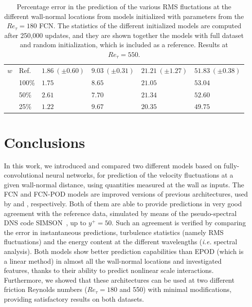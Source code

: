 \begin{table}
{\begin{tabular}{l l*{4}{c}}
        $w$                             & Ref.     & $1.86~(\pm 0.60)$           & $9.03~(\pm 0.31)$            & $21.21~(\pm 1.27)$            & $51.83~(\pm 0.38)$           \\
                                        & 100\%    & $1.75\phantom{~(\pm 0.00)}$ & $8.65\phantom{~(\pm 0.00)}$  & $21.05\phantom{~(\pm 0.00)}$  & $53.04\phantom{~(\pm 0.00)}$ \\
                                        & 50\%     & $2.61\phantom{~(\pm 0.00)}$ & $7.70\phantom{~(\pm 0.00)}$  & $21.34\phantom{~(\pm 0.00)}$  & $52.60\phantom{~(\pm 0.00)}$ \\
                                        & 25\%     & $1.22\phantom{~(\pm 0.00)}$ & $9.67\phantom{~(\pm 0.00)}$  & $20.35\phantom{~(\pm 0.00)}$  & $49.75\phantom{~(\pm 0.00)}$ \\
    \end{tabular}%
    }
    \caption{Percentage error in the prediction of the various RMS fluctations at the different wall-normal locations from models initialized with parameters from the $Re_{\tau}=180$ FCN. The statistics of the different initialized models are computed after 250,000 updates, and they are shown together the models with full dataset and random initialization, which is included as a reference. Results at $Re_{\tau}=550$.}
    \label{tab:RMS_err_transfer}
\end{table}

\section{Conclusions}\label{ss:conclu}

In this work, we introduced and compared two different models based on fully-convolutional neural networks, for prediction of the velocity fluctuations at a given wall-normal distance, using quantities measured at the wall as inputs.
The FCN and FCN-POD models are improved versions of previous architectures, used by \citet{guastoni2020prediction} and \citet{guemes2019sensing}, respectively.
Both of them are able to provide predictions in very good agreement with the reference data, simulated by means of the pseudo-spectral DNS code SIMSON~\citep{chevalier2007pseudo}, up to $y^{+}=50$.
Such an agreement is verified by comparing the error in instantaneous predictions, turbulence statistics (namely RMS fluctuations) and the energy content at the different wavelengths ({\it i.e.} spectral analysis).
Both models show better prediction capabilities than EPOD (which is a linear method) in almost all the wall-normal locations and investigated features, thanks to their ability to predict nonlinear scale interactions.
Furthermore, we showed that these architectures can be used at two different friction Reynolds numbers ($Re_{\tau}=180$ and 550) with minimal modifications, providing satisfactory results on both datasets.

